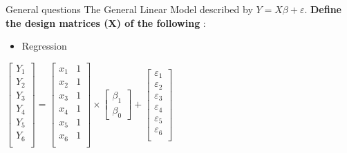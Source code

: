 \documentclass{beamer}
\begin{document}
\begin{frame}{General questions}   
The General Linear Model described by $Y=X\beta+\varepsilon$. \textbf{Define the design matrices (X) of the following} :
  
      \begin{itemize}
	\item Regression
      \end{itemize}
	
      \begin{center}
	$
	\left[\begin{array}{c}
	Y_{1} \\
	Y_{2} \\
	Y_{3} \\
	Y_{4} \\
	Y_{5} \\
	Y_{6} \\
	\end{array}\right]
      =
      \left[\begin{array}{cc}
      x_{1} & 1 \\ 
      x_{2} & 1 \\
      x_{3} & 1 \\
      x_{4} & 1 \\
      x_{5} & 1 \\
      x_{6} & 1 \\ 
      \end{array}\right] 
      \times
      \left[\begin{array}{c} 
      \beta_{1} \\
      \beta_{0} 
      \end{array}\right] 
      + 
      \left[\begin{array}{c} 
      \varepsilon_{1} \\
      \varepsilon_{2} \\
      \varepsilon_{3} \\
      \varepsilon_{4} \\
      \varepsilon_{5} \\
      \varepsilon_{6} \\
      \end{array}\right] 
	$
      \end{center}
\end{frame}

\end{document}
